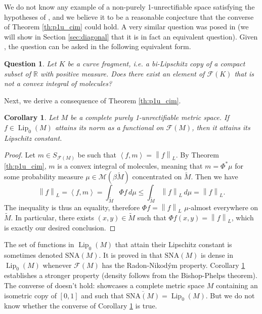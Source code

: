 \documentclass[a4paper,10pt]{amsart}
\DeclareMathOperator{\Lip}{Lip}                             %
\newcommand{\RR}{\mathbb{R}}                                %
\newcommand{\norm}[1]{\left\|{#1}\right\|}                  %
\newcommand{\duality}[1]{\left<{#1}\right>}                 %
\newcommand{\cl}[1]{\overline{#1}}                          %
\newcommand{\lipfree}[1]{\mathcal{F}({#1})}                 %
\newcommand{\lipnorm}[1]{\norm{#1}_L}                       %
\newcommand{\meas}[1]{\mathcal{M}({#1})}                    %
\newcommand{\wt}[1]{\widetilde{#1}}                         %
\renewcommand{\leq}{\leqslant}
\theoremstyle{plain}
\newtheorem{corollary}[theorem]{Corollary}
\newtheorem{question}{Question}
\theoremstyle{definition}
\theoremstyle{remark}
\begin{document}
We do not know any example of a non-purely 1-unrectifiable space satisfying the hypotheses of \cite[Problem 6.9]{APS2}, and we believe it to be a reasonable conjecture that the converse of Theorem \ref{th:p1u_cim} could hold. A very similar question was posed in \cite[Question 4.2]{APS1} (we will show in Section \ref{sec:diagonal} that it is in fact an equivalent question). Given \cite[Corollary 4.13]{Smith24}, the question can be asked in the following equivalent form.

\begin{question}\label{q:curve fragment}
Let $K$ be a curve fragment, i.e. a bi-Lipschitz copy of a compact subset of $\RR$ with positive measure. Does there exist an element of $\lipfree{K}$ that is not a convex integral of molecules?
\end{question}

Next, we derive a consequence of Theorem \ref{th:p1u_cim}.

\begin{corollary}\label{cr:p1u sna}
Let $M$ be a complete purely 1-unrectifiable metric space. If $f\in\Lip_0(M)$ attains its norm as a functional on $\lipfree{M}$, then it attains its Lipschitz constant.
\end{corollary}

\begin{proof}
Let $m\in S_{\lipfree{M}}$ be such that $\duality{f,m}=\lipnorm{f}$. By Theorem \ref{th:p1u_cim}, $m$ is a convex integral of molecules, meaning that $m=\Phi^*\mu$ for some probability measure $\mu\in\meas{\beta\wt{M}}$ concentrated on $\wt{M}$. Then we have
$$
\lipnorm{f} = \duality{f,m} = \int_{\wt{M}} \Phi f \, d\mu \leq \int_{\wt{M}} \lipnorm{f} \, d\mu = \lipnorm{f} .
$$
The inequality is thus an equality, therefore $\Phi f=\lipnorm{f}$ $\mu$-almost everywhere on $\wt{M}$. In particular, there exists $(x,y)\in\wt{M}$ such that $\Phi f(x,y)=\lipnorm{f}$, which is exactly our desired conclusion.
\end{proof}

The set of functions in $\Lip_0(M)$ that attain their Lipschitz constant is sometimes denoted $\mathrm{SNA}(M)$. It is proved in \cite[Theorem 7.4]{GPPR} that $\mathrm{SNA}(M)$ is dense in $\Lip_0(M)$ whenever $\lipfree{M}$ has the Radon-Nikod\'ym property. Corollary \ref{cr:p1u sna} establishes a stronger property (density follows from the Bishop-Phelps theorem). The converse of \cite[Theorem 7.4]{GPPR} doesn't hold: \cite[Theorem 2.5]{CGMRZ} showcases a complete metric space $M$ containing an isometric copy of $[0,1]$ and such that $\cl{\mathrm{SNA}(M)}=\Lip_0(M)$. But we do not know whether the converse of Corollary \ref{cr:p1u sna} is true.
\end{document}
